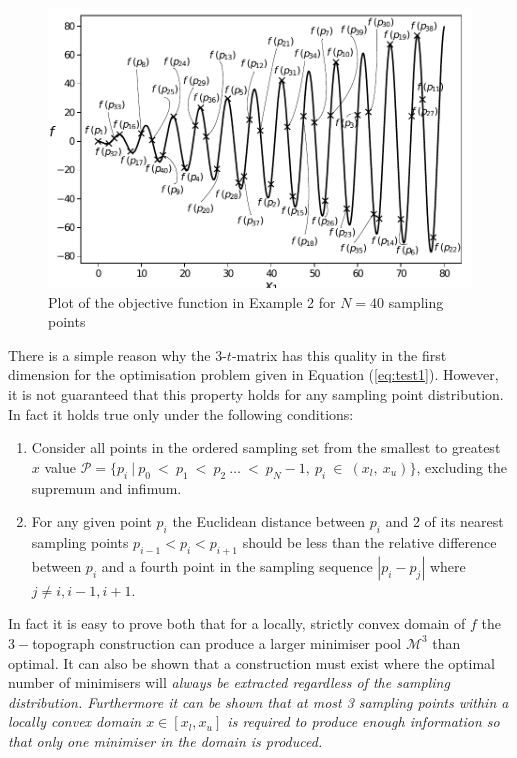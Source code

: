 \begin{figure} 
\centerline{\includegraphics[scale=0.8]{./Fig5.pdf}}
{\caption{Plot of the objective function in Example 2 for $N = 40$ sampling points} \label{fig:pot2}}
\end{figure}

There is a simple reason why the $3$-$t$-matrix has this quality in the first dimension for the optimisation problem given in Equation (\ref{eq:test1}). However, it is not guaranteed that this property holds for any sampling point distribution. In fact it holds true only under the following conditions:
\begin{enumerate}
\item Consider all points in the ordered sampling set from the smallest to greatest $x$ value $\mathcal{P} = \{p_i~|~p_{0}~<~p_{1}~<~p_{2}~\dots~<~p_N-1,~p_{i}~\in~(x_l,~x_u)\}$, excluding the supremum and infimum.
\item For any given point $p_i$ the Euclidean distance between $p_i$ and 2 of its nearest sampling points $p_{i-1} < p_i < p_{i+1}$ should be less than the relative difference between $p_i$ and a fourth point in the sampling sequence $|p_i - p_j|$ where $j \neq {i, i-1, i+1}$.
\end{enumerate}
 
In fact it is easy to prove both that for a locally, strictly convex domain of $f$ the $3-$topograph construction can produce a larger minimiser pool $\mathcal{M}^3$ than optimal. It can also be shown that a construction must exist where the optimal number of minimisers will \it{always} \normalfont be extracted regardless of the sampling distribution. Furthermore it can be shown that at most 3 sampling points within a locally convex domain $x \in [x_l, x_u]$ is required to produce enough information so that only one minimiser in the domain is produced.

